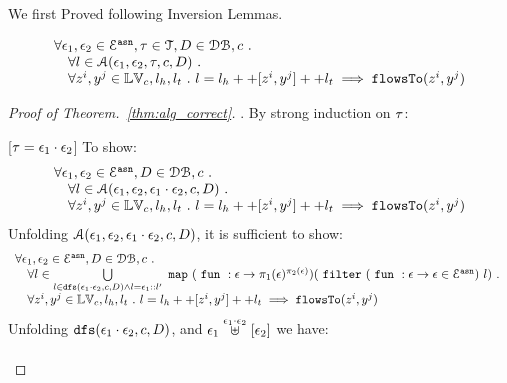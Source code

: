 We first Proved following Inversion Lemmas.

\clearpage

\begin{thm}[Correctness]
\label{thm:alg_correct}
\[
\begin{array}{l}
  \forall \mathtt{\epsilon}_1, \mathtt{\epsilon}_2 \in \mathcal{E}^{\mathtt{{asn}}}, \mathtt{\tau} \in \mathcal{T}, D \in \mathcal{DB} , c ~.~
  \\ \quad 
   \forall l \in \mathcal{A}(\mathtt{\epsilon}_1, \mathtt{\epsilon}_2, \mathtt{\tau}, c, D) ~.~
   \\ \quad 
   \forall z^i, y^j \in \mathbb{LV}_c, l_h, l_t ~.~ 
   l = l_h ++ [z^i, y^j] ++ l_t 
   \implies \mathtt{flowsTo}(z^i, y^j)
\end{array}
\]
\end{thm}

\begin{proof}[Proof of Theorem.~\ref{thm:alg_correct}].
By strong induction on $\mathtt{\tau}$:
\begin{case}
\label{case:alg_correct_base}
[$\mathtt{\tau} = \mathtt{\epsilon}_1 \cdot \mathtt{\epsilon}_2$]
To show:
\[
\begin{array}{l}
  \forall \mathtt{\epsilon}_1, \mathtt{\epsilon}_2 \in \mathcal{E}^{\mathtt{{asn}}}, D \in \mathcal{DB} , c ~.~
  \\ \quad 
   \forall l \in \mathcal{A}( \mathtt{\epsilon}_1, \mathtt{\epsilon}_2,  \mathtt{\epsilon}_1 \cdot \mathtt{\epsilon}_2, c, D) ~.~
   \\ \quad 
   \forall z^i, y^j \in \mathbb{LV}_c, l_h, l_t ~.~ 
   l = l_h ++ [z^i, y^j] ++ l_t 
   \implies \mathtt{flowsTo}(z^i, y^j)
\end{array}
\]
%
Unfolding $\mathcal{A}(\mathtt{\epsilon}_1, \mathtt{\epsilon}_2, \mathtt{\epsilon}_1 \cdot \mathtt{\epsilon}_2, c, D)$, it is sufficient to show:
%
\[
\begin{array}{l}
  \forall \mathtt{\epsilon}_1, \mathtt{\epsilon}_2 \in \mathcal{E}^{\mathtt{{asn}}}, D \in \mathcal{DB} , c ~.~
  \\ \quad 
   \forall l \in  \bigcup\limits_{l \in \mathtt{dfs}(\mathtt{\epsilon}_1 \cdot \mathtt{\epsilon}_2, c, D) \land l = \mathtt{\epsilon}_1 :: l'}
  ~\mathtt{map}~ 
  (~\mathtt{fun}~ : \mathtt{\epsilon} \to \pi_1(\mathtt{\epsilon})^{\pi_2(\mathtt{\epsilon})})  
  (~\mathtt{filter}~ 
    (~\mathtt{fun}~ : \mathtt{\epsilon} \to  \mathtt{\epsilon} \in \mathcal{E}^{\mathtt{{asn}}}) ~ l)
 ~.~
   \\ \quad 
   \forall z^i, y^j \in \mathbb{LV}_c, l_h, l_t ~.~ 
   l = l_h ++ [z^i, y^j] ++ l_t 
   \implies \mathtt{flowsTo}(z^i, y^j)
\end{array}
\]
%
Unfolding $\mathtt{dfs}(\mathtt{\epsilon}_1 \cdot \mathtt{\epsilon}_2, c, D)$, and $\mathtt{\epsilon}_1 \stackrel{\mathtt{\epsilon}_1 \cdot \mathtt{\epsilon}_2}{\uplus} [\mathtt{\epsilon}_2] $ we have:
\[
\begin{array}{l}

\end{array}\]
\end{case}
\end{proof}
